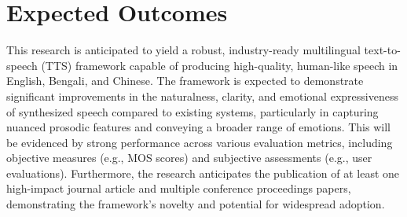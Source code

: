 \section*{ Expected Outcomes}

This research is anticipated to yield a robust, industry-ready multilingual text-to-speech (TTS) framework capable of producing high-quality, human-like speech in English, Bengali, and Chinese. The framework is expected to demonstrate significant improvements in the naturalness, clarity, and emotional expressiveness of synthesized speech compared to existing systems, particularly in capturing nuanced prosodic features and conveying a broader range of emotions. This will be evidenced by strong performance across various evaluation metrics, including objective measures (e.g., MOS scores) and subjective assessments (e.g., user evaluations). Furthermore, the research anticipates the publication of at least one high-impact journal article and multiple conference proceedings papers, demonstrating the framework's novelty and potential for widespread adoption.